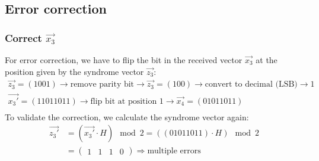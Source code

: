 \subsection*{Error correction}
\subsubsection*{Correct $\vec{x_3}$}
For error correction, we have to flip the bit in the received vector $\vec{x_3}$ at the position given by the syndrome vector $\vec{z_3}$:
\begin{align*}
  \vec{z_3} = (1001) \rightarrow \text{remove parity bit} \rightarrow \vec{z_3} = (100) \rightarrow \text{convert to decimal (LSB)} \rightarrow 1\\
  \vec{x_3'} = (11011011) \rightarrow \text{flip bit at position 1} \rightarrow \vec{x_4} = (0 1 0 1 1011)\\
\end{align*}
To validate the correction, we calculate the syndrome vector again:
\begin{align*}
  \vec{z_3'} & = (\vec{x_3'} \cdot H) \mod 2 = ((01011011) \cdot H) \mod 2\\
   &= \begin{pmatrix}1 &1 &1 &0\end{pmatrix} \Rightarrow \text{multiple errors}\\
\end{align*}

